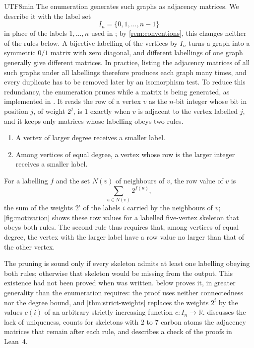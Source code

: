\documentclass[reqno]{amsart}
\theoremstyle{definition}
\newcommand{\R}{\mathbb{R}}
\numberwithin{equation}{section}
\begin{document}
\begin{CJK*}{UTF8}{min}
The enumeration generates such graphs as adjacency matrices. We describe it
with the label set
\[
  I_n=\{0,1,\ldots,n-1\}
\]
in place of the labels \(1,\ldots,n\) used in \cite{smooth-pudding-2024}; by
\cref{rem:conventions}, this changes neither of the rules below. A bijective labelling of the vertices by \(I_n\) turns a graph into a symmetric
\(0/1\) matrix with zero diagonal, and different labellings of one graph
generally give different matrices. In practice, listing the adjacency matrices
of all such graphs under all labellings therefore produces each graph many
times, and every
duplicate has to be removed later by an isomorphism test. To reduce this
redundancy, the enumeration prunes while a matrix is being generated, as
implemented in \cite[directory \texttt{p2\_ch03-2}]{hydrocarbon-rta-2025}. It reads
the row of a vertex \(v\) as the \(n\)-bit integer whose bit in position \(j\),
of weight \(2^j\), is \(1\) exactly when \(v\) is adjacent to the vertex
labelled \(j\), and it keeps only matrices whose labelling obeys two rules.
\begin{enumerate}
  \item A vertex of larger degree receives a smaller label.
  \item Among vertices of equal degree, a vertex whose row is the larger
    integer receives a smaller label.
\end{enumerate}
For a labelling \(f\) and the set \(N(v)\) of neighbours of \(v\), the row
value of \(v\) is
\[
  \sum_{u\in N(v)}2^{f(u)},
\]
the sum of the weights \(2^i\) of the labels \(i\) carried by the neighbours of
\(v\); \cref{fig:motivation} shows these row values for a labelled
five-vertex skeleton that obeys both rules. The second rule thus requires that, among vertices of equal degree, the
vertex with the larger label have a row value no larger than that of the
other vertex.

The pruning is sound only if every skeleton admits at least one labelling
obeying both rules; otherwise that skeleton would be missing from the output. This existence had not been proved
when \cite{smooth-pudding-2024} was written.  below
proves it, in greater generality than the enumeration requires: the proof uses
neither connectedness nor the degree bound, and
\cref{thm:strict-weights} replaces the weights \(2^i\) by the values \(c(i)\)
of an arbitrary strictly increasing function \(c:I_n\to\R\).
 discusses the lack of uniqueness, counts
for skeletons with \(2\) to \(7\) carbon atoms the adjacency matrices that remain
after each rule, and describes a check of the proofs in Lean~4.


\end{CJK*}
\end{document}
